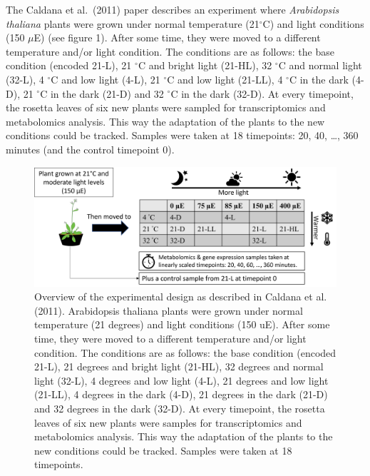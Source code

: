 \documentclass[
]{article}
\begin{document}
The Caldana et al.~(2011) paper describes an experiment where
\emph{Arabidopsis thaliana} plants were grown under normal temperature
(21\(^\circ\)C) and light conditions (150 \(\mu\)E) (see figure 1).
After some time, they were moved to a different temperature and/or light
condition. The conditions are as follows: the base condition (encoded
21-L), 21 \(^\circ\)C and bright light (21-HL), 32 \(^\circ\)C and
normal light (32-L), 4 \(^\circ\)C and low light (4-L), 21 \(^\circ\)C
and low light (21-LL), 4 \(^\circ\)C in the dark (4-D), 21 \(^\circ\)C
in the dark (21-D) and 32 \(^\circ\)C in the dark (32-D). At every
timepoint, the rosetta leaves of six new plants were sampled for
transcriptomics and metabolomics analysis. This way the adaptation of
the plants to the new conditions could be tracked. Samples were taken at
18 timepoints: 20, 40, \ldots, 360 minutes (and the control timepoint
0).

\begin{figure}

{\centering \includegraphics[width=1\linewidth,height=1\textheight]{./new experimental design} 

}

\caption{Overview of the experimental design as described in Caldana et al. (2011). Arabidopsis thaliana plants were grown under normal temperature (21 degrees) and light conditions (150 uE). After some time, they were moved to a different temperature and/or light condition. The conditions are as follows: the base condition (encoded 21-L), 21 degrees and bright light (21-HL), 32 degrees and normal light (32-L), 4 degrees and low light (4-L), 21 degrees and low light (21-LL), 4 degrees in the dark (4-D), 21 degrees in the dark (21-D) and 32 degrees in the dark (32-D). At every timepoint, the rosetta leaves of six new plants were samples for transcriptomics and metabolomics analysis. This way the adaptation of the plants to the new conditions could be tracked. Samples were taken at 18 timepoints.}\label{fig:unnamed-chunk-1}
\end{figure}
\end{document}
